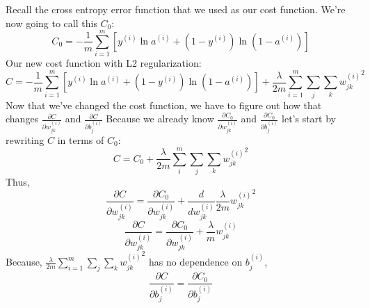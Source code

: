 \documentclass[11pt]{article}
\begin{document}
Recall the cross entropy error function that we used as our cost function. We're now going to call this $C_0$:
\[C_0 = - \frac{1}{m} \sum_{i = 1}^m \left[y^{(i)} \ln a^{(i)} + (1 - y^{(i)}) \ln \left(1 - a^{(i)}\right)\right]\]
Our new cost function with L2 regularization:
\[C = - \frac{1}{m} \sum_{i = 1}^m \left[y^{(i)} \ln a^{(i)} + (1 - y^{(i)}) \ln \left(1 - a^{(i)}\right)\right] + \frac{\lambda}{2m} \sum_{i = 1}^m \sum_j \sum_k {w_{jk}^{(i)}}^2\]
Now that we've changed the cost function, we have to figure out how that changes $\frac{\partial C}{\partial w_{jk}^{(i)}}$ and $\frac{\partial C}{\partial b_j^{(i)}}$ Because we already know $\frac{\partial C_0}{\partial w_{jk}^{(i)}}$ and $\frac{\partial C_0}{\partial b_j^{(i)}}$ let's start by rewriting $C$ in terms of $C_0$:
\[C = C_0 + \frac{\lambda}{2m} \sum_i^m \sum_j \sum_k {w_{jk}^{(i)}}^2\]
Thus,
\[\frac{\partial C}{\partial w_{jk}^{(i)}} = \frac{\partial C_0}{\partial w_{jk}^{(i)}} + \frac{d}{d w_{jk}^{(i)}} \frac{\lambda}{2m} {w_{jk}^{(i)}}^2\]
\[\frac{\partial C}{\partial w_{jk}^{(i)}} = \frac{\partial C_0}{\partial w_{jk}^{(i)}} + \frac{\lambda}{m} w_{jk}^{(i)}\]
Because, $\frac{\lambda}{2m} \sum\limits_{i = 1}^m \sum\limits_j \sum\limits_k {w_{jk}^{(i)}}^2$ has no dependence on $b_j^{(i)}$,
\[\frac{\partial C}{\partial b_j^{(i)}} = \frac{\partial C_0}{\partial b_j^{(i)}}\]
\end{document}

